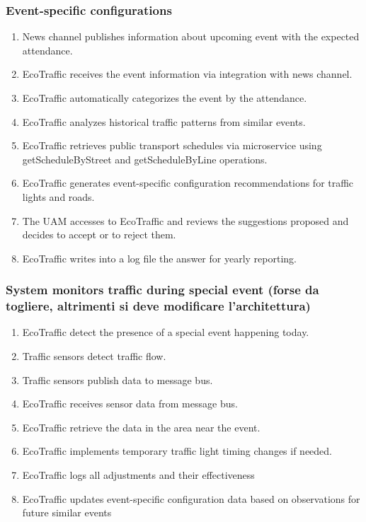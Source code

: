 \documentclass[12pt, a4paper, twoside, openright]{report}
\begin{document}
\subsubsection{Event-specific configurations}\label{subsubsec:event-specific}

\begin{enumerate}
\item
  News channel publishes information about upcoming event with the
  expected attendance.
\item
  EcoTraffic receives the event information via integration with news
  channel.
\item
  EcoTraffic automatically categorizes the event by the attendance.
\item
  EcoTraffic analyzes historical traffic patterns from similar events.
\item
  EcoTraffic retrieves public transport schedules via microservice using
  getScheduleByStreet and getScheduleByLine operations.
\item
  EcoTraffic generates event-specific configuration recommendations for
  traffic lights and roads.
\item
  The UAM accesses to EcoTraffic and reviews the suggestions proposed
  and decides to accept or to reject them.
\item
  EcoTraffic writes into a log file the answer for yearly reporting.
\end{enumerate}

\subsubsection{System monitors traffic during special event (forse da togliere,
altrimenti si deve modificare l'architettura)}\label{subsubsec:system-monitors}

\begin{enumerate}
\item
  EcoTraffic detect the presence of a special event happening today.
\item
  Traffic sensors detect traffic flow.
\item
  Traffic sensors publish data to message bus.
\item
  EcoTraffic receives sensor data from message bus.
\item
  EcoTraffic retrieve the data in the area near the event.
\item
  EcoTraffic implements temporary traffic light timing changes if
  needed.
\item
  EcoTraffic logs all adjustments and their effectiveness
\item
  EcoTraffic updates event-specific configuration data based on
  observations for future similar events
\end{enumerate}
\end{document}
